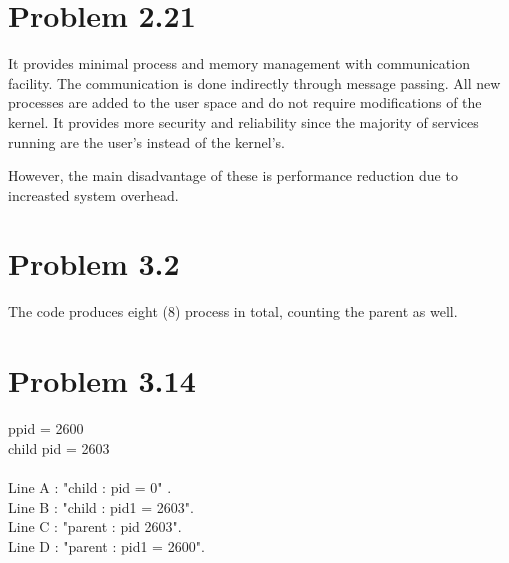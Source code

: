 \documentclass[a4paper,11pt]{article}
\theoremstyle{mytheor}
\begin{document}
\section*{Problem 2.21}
It provides minimal process and memory management with communication facility. The communication is done indirectly through message passing. All new processes are added to the user space and do not require modifications of the kernel. It provides more security and reliability since the majority of services running are the user's instead of the kernel's.
\par 
However, the main disadvantage of these is performance reduction due to increasted system overhead.

\pagebreak

\section*{Problem 3.2}
The code produces eight (8) process in total, counting the parent as well. 

\section*{Problem 3.14}
ppid = 2600\\
child pid = 2603\\
\\
Line A : "child : pid = 0" .  \\
Line B : "child : pid1 = 2603".\\
Line C : "parent : pid 2603".\\
Line D : "parent : pid1 = 2600".\\
\end{document}
